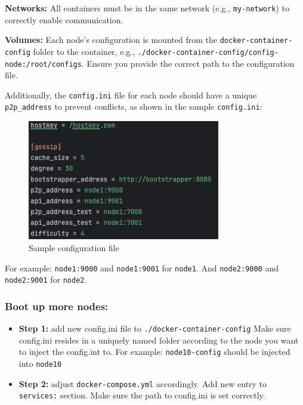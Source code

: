 \textbf{Networks:} All containers must be in the same network (e.g., \texttt{my-network}) to correctly enable communication.

\textbf{Volumes:} Each node's configuration is mounted from the \texttt{docker-container-config} folder to the container, e.g., \texttt{./docker-container-config/config-node:/root/configs}. Ensure you provide the correct path to the configuration file.

Additionally, the \texttt{config.ini} file for each node should have a unique \texttt{p2p\_address} to prevent conflicts, as shown in the sample \texttt{config.ini}:

\begin{figure}[H]
    \centering
    \includegraphics[width=0.75\textwidth]{pics/config.png}
    \caption{Sample configuration file}
    \label{fig:config}
\end{figure}

For example: \texttt{node1:9000} and \texttt{node1:9001} for \texttt{node1}. And \texttt{node2:9000} and \texttt{node2:9001} for \texttt{node2}.

\subsubsection{Boot up more nodes:}
  \begin{itemize}
    \item \textbf{Step 1:} add new config.ini file to \texttt{./docker-container-config} Make sure config.ini resides in a uniquely named folder according to the node you want to inject the config.int to. For example: \texttt{node10-config} should be injected into \texttt{node10}
    \item \textbf{Step 2:} adjust \texttt{docker-compose.yml} accordingly. Add new entry to \texttt{services:} section. Make sure the path to config.ini is set correctly.
  \end{itemize}
  
